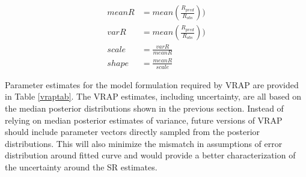 \documentclass{article}
\begin{document}
\begin{align} 
\label{meanRgamma}
meanR &= mean(\frac{R_{pred}}{R_{obs}}))\\
\label{varRgamma}
varR &= mean(\frac{R_{pred}}{R_{obs}}))\\
\label{scalegamma}
scale &= \frac{varR}{meanR} \\
\label{shapegamma}
shape &= \frac{meanR}{scale} 
\end{align}


 Parameter estimates for the model formulation required by VRAP  are provided in Table \ref{vraptab}. The VRAP estimates, including uncertainty, are all based on the median posterior distributions shown in the previous section. Instead of relying on median posterior estimates of variance, future versions of VRAP should include parameter vectors directly sampled from the posterior distributions. This will also minimize the mismatch in assumptions of error distribution around fitted curve and would provide a better characterization of the uncertainty around the SR estimates.











%







\end{document}
